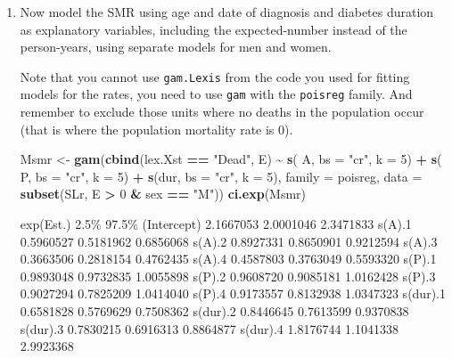 \documentclass[
]{book}
\newenvironment{Shaded}{\begin{snugshade}}{\end{snugshade}}
\newcommand{\AttributeTok}[1]{\textcolor[rgb]{0.13,0.29,0.53}{#1}}
\newcommand{\DecValTok}[1]{\textcolor[rgb]{0.00,0.00,0.81}{#1}}
\newcommand{\FunctionTok}[1]{\textcolor[rgb]{0.13,0.29,0.53}{\textbf{#1}}}
\newcommand{\NormalTok}[1]{#1}
\newcommand{\OtherTok}[1]{\textcolor[rgb]{0.56,0.35,0.01}{#1}}
\newcommand{\SpecialCharTok}[1]{\textcolor[rgb]{0.81,0.36,0.00}{\textbf{#1}}}
\newcommand{\StringTok}[1]{\textcolor[rgb]{0.31,0.60,0.02}{#1}}
\begin{document}
\begin{enumerate}
\def\labelenumi{\arabic{enumi}.}
\setcounter{enumi}{13}
\item
  Now model the SMR using age and date of diagnosis and diabetes
  duration as explanatory variables, including the expected-number
  instead of the person-years, using separate models for
  men and women.

  Note that you cannot use \texttt{gam.Lexis} from the code you used for
  fitting models for the rates, you need to use \texttt{gam} with
  the \texttt{poisreg} family. And remember to exclude those units
  where no deaths in the population occur (that is where the
  population mortality rate is 0).

\begin{Shaded}
\begin{Highlighting}[]
\NormalTok{Msmr }\OtherTok{\textless{}{-}} \FunctionTok{gam}\NormalTok{(}\FunctionTok{cbind}\NormalTok{(lex.Xst }\SpecialCharTok{==} \StringTok{"Dead"}\NormalTok{, E) }
            \SpecialCharTok{\textasciitilde{}} \FunctionTok{s}\NormalTok{(  A, }\AttributeTok{bs =} \StringTok{"cr"}\NormalTok{, }\AttributeTok{k =} \DecValTok{5}\NormalTok{) }\SpecialCharTok{+}
              \FunctionTok{s}\NormalTok{(  P, }\AttributeTok{bs =} \StringTok{"cr"}\NormalTok{, }\AttributeTok{k =} \DecValTok{5}\NormalTok{) }\SpecialCharTok{+}
              \FunctionTok{s}\NormalTok{(dur, }\AttributeTok{bs =} \StringTok{"cr"}\NormalTok{, }\AttributeTok{k =} \DecValTok{5}\NormalTok{),}
            \AttributeTok{family =}\NormalTok{ poisreg,}
              \AttributeTok{data =} \FunctionTok{subset}\NormalTok{(SLr, E }\SpecialCharTok{\textgreater{}} \DecValTok{0} \SpecialCharTok{\&}\NormalTok{ sex }\SpecialCharTok{==} \StringTok{"M"}\NormalTok{))}
\FunctionTok{ci.exp}\NormalTok{(Msmr)}
\end{Highlighting}
\end{Shaded}

\begin{Shaded}
\begin{Highlighting}[]
\NormalTok{            exp(Est.)      2.5\%     97.5\%}
\NormalTok{(Intercept) 2.1667053 2.0001046 2.3471833}
\NormalTok{s(A).1      0.5960527 0.5181962 0.6856068}
\NormalTok{s(A).2      0.8927331 0.8650901 0.9212594}
\NormalTok{s(A).3      0.3663506 0.2818154 0.4762435}
\NormalTok{s(A).4      0.4587803 0.3763049 0.5593320}
\NormalTok{s(P).1      0.9893048 0.9732835 1.0055898}
\NormalTok{s(P).2      0.9608720 0.9085181 1.0162428}
\NormalTok{s(P).3      0.9027294 0.7825209 1.0414040}
\NormalTok{s(P).4      0.9173557 0.8132938 1.0347323}
\NormalTok{s(dur).1    0.6581828 0.5769629 0.7508362}
\NormalTok{s(dur).2    0.8446645 0.7613599 0.9370838}
\NormalTok{s(dur).3    0.7830215 0.6916313 0.8864877}
\NormalTok{s(dur).4    1.8176744 1.1041338 2.9923368}
\end{Highlighting}
\end{Shaded}


\end{enumerate}
\end{document}
